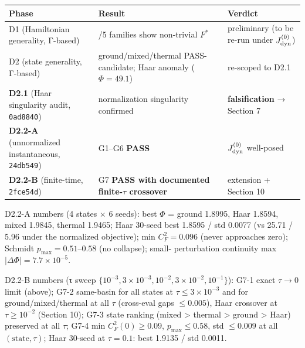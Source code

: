 \documentclass[
]{article}
\begin{document}
{\def\LTcaptype{none} %
\begin{longtable}[]{@{}
  >{\raggedright\arraybackslash}p{}
  >{\raggedright\arraybackslash}p{}
  >{\raggedright\arraybackslash}p{}@{}}
\toprule\noalign{}
\begin{minipage}[b]{\linewidth}\raggedright
Phase
\end{minipage} & \begin{minipage}[b]{\linewidth}\raggedright
Result
\end{minipage} & \begin{minipage}[b]{\linewidth}\raggedright
Verdict
\end{minipage} \\
\midrule\noalign{}
\endhead
\bottomrule\noalign{}
\endlastfoot
D1 (Hamiltonian generality, Γ-based) & 5/5 families show non-trivial
\(F^*\) & preliminary (to be re-run under \(J_{\rm dyn}^{(0)}\)) \\
D2 (state generality, Γ-based) & ground/mixed/thermal PASS-candidate;
Haar anomaly (\(\Phi=49.1\)) & re-scoped to D2.1 \\
\textbf{D2.1} (Haar singularity audit, \texttt{0ad8840}) & normalization
singularity confirmed & \textbf{falsification} → Section 7 \\
\textbf{D2.2-A} (unnormalized instantaneous, \texttt{24db549}) & G1--G6
\textbf{PASS} & \(J_{\rm dyn}^{(0)}\) well-posed \\
\textbf{D2.2-B} (finite-time, \texttt{2fce54d}) & G7 \textbf{PASS with
documented finite-\(\tau\) crossover} & extension + Section 10 \\
\end{longtable}
}

D2.2-A numbers (4 states × 6 seeds): best \(\Phi\) = ground 1.8995, Haar
1.8594, mixed 1.9845, thermal 1.9465; Haar 30-seed best 1.8595 / std
0.0077 (vs 25.71 / 5.96 under the normalized objective); min
\(C_F^2 = 0.096\) (never approaches zero); Schmidt
\(p_{\max} = 0.51\)--\(0.58\) (no collapse); small- perturbation
continuity max \(|\Delta\Phi| = 7.7\times10^{-5}\).

D2.2-B numbers (τ sweep
\(\{10^{-3}, 3\times10^{-3}, 10^{-2}, 3\times10^{-2},
10^{-1}\}\)): G7-1 exact \(\tau\to0\) limit (above); G7-2 same-basin for
all states at \(\tau\le3\times10^{-3}\) and for ground/mixed/thermal at
all \(\tau\) (cross-eval gaps \(\le 0.005\)), Haar crossover at
\(\tau\ge10^{-2}\) (Section 10); G7-3 state ranking (mixed
\textgreater{} thermal \textgreater{} ground \textgreater{} Haar)
preserved at all \(\tau\); G7-4 min \(C_F^2(0) \ge 0.09\),
\(p_{\max} \le 0.58\), std \(\le 0.009\) at all
\((\mathrm{state},\tau)\); Haar 30-seed at \(\tau=0.1\): best 1.9135 /
std 0.0011.
\end{document}
